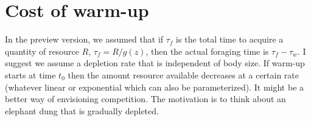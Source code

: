 \section{Cost of warm-up} %
\label{sec:cost_of_warm_up}
In the preview version, we assumed that if $\tau_f$ is the total time to acquire a quantity of resource $R$, $\tau_f = R/g(z)$, then the actual foraging time is $\tau_f - \tau_w$. 
I suggest we assume a depletion rate that is independent of body size. 
If warm-up starts at time $t_0$ then the amount resource available decreases at a certain rate (whatever linear or exponential which can also be parameterized).
It might be a better way of envisioning competition. 
The motivation is to think about an elephant dung that is gradually depleted.






